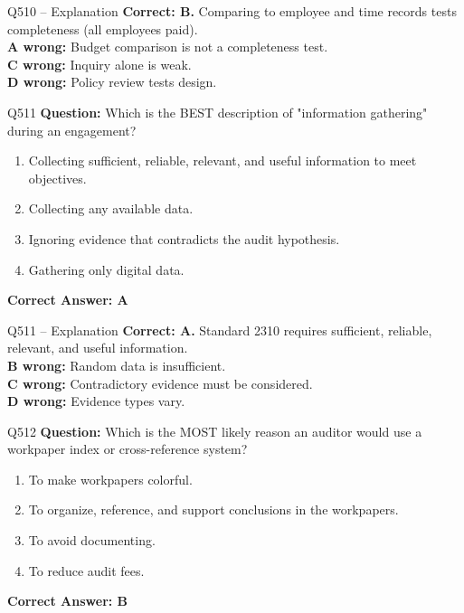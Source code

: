 \documentclass[aspectratio=169,10pt]{beamer}
\begin{document}
	\begin{frame}[t]{Q510 -- Explanation}
		\small
		\textbf{Correct: B.} Comparing to employee and time records tests completeness (all employees paid). \\[4pt]
		\textbf{A wrong:} Budget comparison is not a completeness test. \\[2pt]
		\textbf{C wrong:} Inquiry alone is weak. \\[2pt]
		\textbf{D wrong:} Policy review tests design.
	\end{frame}
	
	\begin{frame}[t]{Q511}
		\small
		\textbf{Question:} Which is the BEST description of "information gathering" during an engagement?
		\begin{enumerate}[label=\Alph*.,itemsep=1pt,topsep=2pt]
			\item Collecting sufficient, reliable, relevant, and useful information to meet objectives.
			\item Collecting any available data.
			\item Ignoring evidence that contradicts the audit hypothesis.
			\item Gathering only digital data.
		\end{enumerate}
		\vspace{4pt}
		\textbf{Correct Answer: A}
	\end{frame}
	
	\begin{frame}[t]{Q511 -- Explanation}
		\small
		\textbf{Correct: A.} Standard 2310 requires sufficient, reliable, relevant, and useful information. \\[4pt]
		\textbf{B wrong:} Random data is insufficient. \\[2pt]
		\textbf{C wrong:} Contradictory evidence must be considered. \\[2pt]
		\textbf{D wrong:} Evidence types vary.
	\end{frame}
	
	\begin{frame}[t]{Q512}
		\small
		\textbf{Question:} Which is the MOST likely reason an auditor would use a workpaper index or cross-reference system?
		\begin{enumerate}[label=\Alph*.,itemsep=1pt,topsep=2pt]
			\item To make workpapers colorful.
			\item To organize, reference, and support conclusions in the workpapers.
			\item To avoid documenting.
			\item To reduce audit fees.
		\end{enumerate}
		\vspace{4pt}
		\textbf{Correct Answer: B}
	\end{frame}
	
\end{document}
